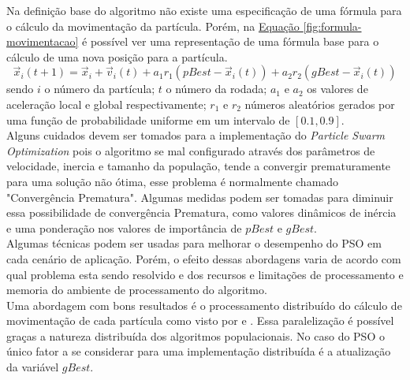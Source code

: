 Na definição base do algoritmo não existe uma especificação de uma fórmula para o cálculo da movimentação da partícula. Porém, na 
\hyperref[fig:formula-movimentacao]{Equação \ref{fig:formula-movimentacao}} 
é possível ver uma representação de uma fórmula base para o cálculo de uma nova posição para a partícula.
%
\begin{equation} 
    \label{fig:formula-movimentacao}
    \vec x_i(t+1) = \vec x_i + \vec v_i(t) + a_1 r_1 (pBest - \vec x_i(t)) + a_2 r_2 (gBest - \vec x_i(t))
\end{equation}
sendo $i$ o número da partícula; $t$ o número da rodada; $a_1$ e $a_2$ os valores de aceleração local e global respectivamente; $r_1$ e $r_2$ números aleatórios gerados por uma função de probabilidade uniforme em um intervalo de $[0.1, 0.9]$. \\
\indent Alguns cuidados devem ser tomados para a implementação do \textit{Particle Swarm Optimization} pois o algoritmo se mal configurado através dos parâmetros de velocidade, inercia e tamanho da população, tende a convergir prematuramente para uma solução não ótima, esse problema é normalmente chamado "Convergência Prematura".
%
Algumas medidas podem ser tomadas para diminuir essa possibilidade de convergência Prematura, como valores dinâmicos de inércia e uma ponderação nos valores de importância de $pBest$ e $gBest$.\\
\indent Algumas técnicas podem ser usadas para melhorar o desempenho do PSO em cada cenário de aplicação. Porém, o efeito dessas abordagens varia de acordo com qual problema esta sendo resolvido e dos recursos e limitações de processamento e memoria do ambiente de processamento do algoritmo.\\
\indent Uma abordagem com bons resultados é o processamento distribuído do cálculo de movimentação de cada partícula como visto por \cite{Thongkrairat2019} e \cite{Kim2011}. Essa paralelização é possível graças a natureza distribuída dos algoritmos populacionais. No caso do PSO o único fator a se considerar para uma implementação distribuída é a atualização da variável $gBest$.\\
